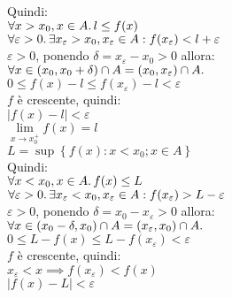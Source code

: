 \documentclass[a4paper, twoside, italian, 11pt]{book}
\newcommand{\braces}[1] {\left \{ #1 \right \}}
\newcommand{\abs}[1] {\left | #1 \right |}
\begin{document}
\noindent
Quindi: \\

\noindent
$\forall x > x_0, x \in A \ldotp l \leq f(x)$ \\

\noindent
$\forall \varepsilon > 0 \ldotp \exists x_\varepsilon > x_0, x_\varepsilon \in A : f(x_\varepsilon) < l + \varepsilon$ \\

\noindent
$\varepsilon > 0$, ponendo $\delta = x_\varepsilon - x_0 > 0$ allora: \\

\noindent
$\forall x \in (x_0, x_0 + \delta) \cap A = (x_0, x_\varepsilon) \cap A \ldotp$ \\

$0 \leq f(x) - l \leq f(x_\varepsilon) - l < \varepsilon$ \\

\noindent
$f$ è crescente, quindi: \\

$\abs{f(x) - l} < \varepsilon$ \\

$\lim\limits_{x \to x_0^+} f(x) = l$ \\

\noindent
$L = \sup \braces{f(x) : x < x_0; x \in A}$ \\

\noindent
Quindi: \\

$\forall x < x_0, x \in A \ldotp f(x) \leq L$ \\

$\forall \varepsilon > 0 \ldotp \exists x_\varepsilon < x_0, x_\varepsilon \in A : f(x_\varepsilon) > L - \varepsilon$ \\

\noindent
$\varepsilon > 0$, ponendo $\delta = x_0 - x_\varepsilon > 0$ allora: \\

\noindent
$\forall x \in (x_0 - \delta, x_0) \cap A = (x_\varepsilon, x_0) \cap A \ldotp$ \\

$0 \leq L - f(x) \leq L - f(x_\varepsilon) < \varepsilon$ \\

\noindent
$f$ è crescente, quindi: \\

$x_\varepsilon < x \implies f(x_\varepsilon) < f(x)$ \\

$\abs{f(x) - L} < \varepsilon$ \\
\end{document}
